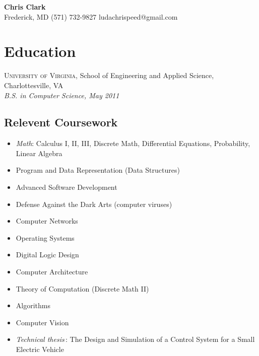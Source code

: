 \documentclass[a4paper,11pt]{article}
\begin{document}
\begin{center}
  {\sffamily \huge \textbf{Chris Clark}} \\ 
  Frederick, MD \enspace\textopenbullet\enspace 
  (571) 732-9827 \enspace\textopenbullet\enspace 
  ludachrispeed@gmail.com
\end{center}


\vspace{-8pt}
\section*{Education}

  \textsc{University of Virginia}, School of Engineering and Applied Science,
  Charlottesville, VA \\
  \textit{B.S. in Computer Science, May 2011}

%

  \subsection*{Relevent Coursework}

  \begin{multicols}{2} 
    \raggedright

    \begin{itemize}
    \item \textit{Math}: Calculus I, II, III, Discrete Math, Differential
      Equations, Probability, Linear Algebra
    \item Program and Data Representation (Data Structures)
    \item Advanced Software Development
    \item Defense Against the Dark Arts (computer viruses)
    \item Computer Networks
    \item Operating Systems
    \item Digital Logic Design
    \item Computer Architecture
    \item Theory of Computation (Discrete Math II)
    \item Algorithms
    \item Computer Vision
    \item \textsl{Technical thesis\,}: The Design and Simulation of a Control
      System for a Small Electric Vehicle
    \end{itemize}
  \end{multicols}
\end{document}
